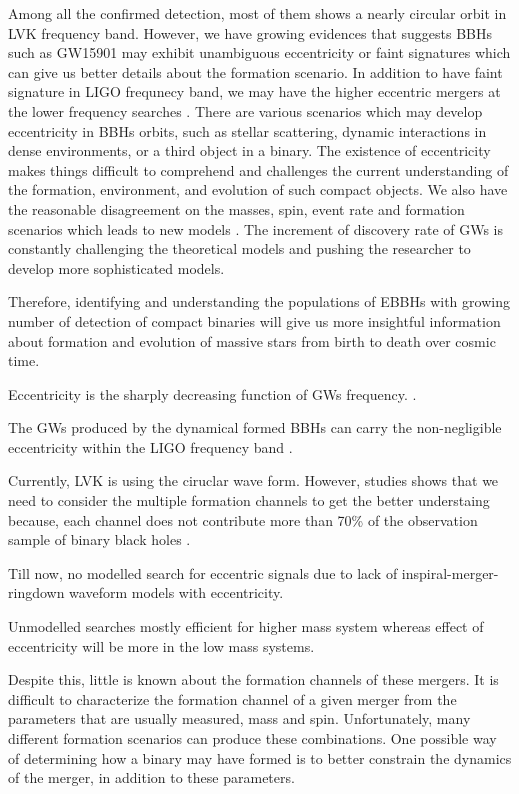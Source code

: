 \documentclass[twocolumn,prd,nofootinbib]{revtex4}
\begin{document}
Among all the confirmed detection, most of them shows a nearly circular orbit in LVK frequency band. However, we have growing evidences that suggests BBHs such as GW15901 may exhibit unambiguous eccentricity or faint signatures \cite{Gamba_2022_GW190521_dynamical,yumeng-2023,Isobel-2022} which can give us better details about the formation scenario. In addition to have faint signature in LIGO frequnecy band, we may have the higher eccentric mergers at the lower frequency searches \cite{sesana-2016,chen-2017}.
There are various scenarios which may develop eccentricity in BBHs orbits, such as stellar scattering, dynamic interactions in dense environments, or a third object in a binary. The existence of eccentricity makes things difficult to comprehend and challenges the current understanding of the formation, environment, and evolution of such compact objects. We also have the reasonable disagreement on the masses, spin, event rate and formation scenarios \cite{LSC-BBH-2016,LSC-GW150914-2016} which leads to new models \cite{Mandel-2016,marchant-2016}. The increment of discovery rate of GWs is constantly challenging the theoretical models and pushing the researcher to develop more sophisticated models. 

Therefore, identifying and understanding the populations of EBBHs with growing number of detection of compact binaries will give us more insightful information about formation and evolution of massive stars from birth to death over cosmic time. 


Eccentricity is the sharply decreasing function of GWs frequency. \cite{peters-1964}.

The GWs produced by the dynamical formed BBHs can carry the non-negligible eccentricity within the LIGO frequency band \cite{samsing-2018, Rodriguez-2018,Antonini-2014}. 

Currently, LVK is using the ciruclar wave form. However, studies shows that we need to consider the multiple formation channels to get the better understaing because, each channel does not contribute more than 70\% of the observation sample of binary black holes \cite{zevin-2021}.


Till now, no modelled search for eccentric signals due to lack of inspiral-merger-ringdown waveform models with eccentricity.

Unmodelled searches mostly efficient for higher mass system whereas effect of eccentricity will be more in the low mass systems.

Despite this, little is known about the formation channels of these mergers. It is difficult to characterize the formation channel of a given merger from the parameters that are usually measured, mass and spin. Unfortunately, many different formation scenarios can produce these combinations. One possible way of determining how a binary may have formed is to better constrain the dynamics of the merger, in addition to these parameters.
\end{document}
